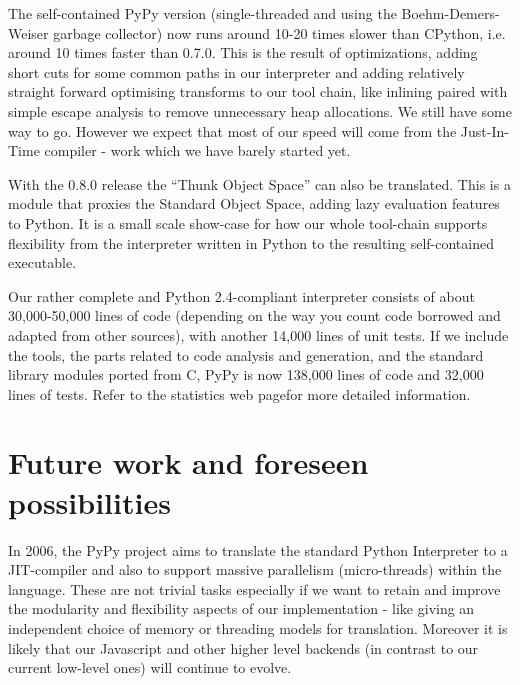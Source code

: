 \documentclass[a4paper,11pt,english]{article}
\begin{document}
The self-contained PyPy version (single-threaded and using the
Boehm-Demers-Weiser garbage collector\footnotemark[10]) now runs around 10-20
times slower than CPython, i.e. around 10 times faster than 0.7.0.
This is the result of optimizations, adding short cuts for some common
paths in our interpreter and adding relatively straight forward
optimising transforms to our tool chain, like inlining paired with
simple escape analysis to remove unnecessary heap allocations.  We
still have some way to go. However we expect that most of our speed
will come from the Just-In-Time compiler - work which we have barely
started yet.

With the 0.8.0 release the ``Thunk Object Space'' can also be
translated. This is a module that proxies the Standard Object Space,
adding lazy evaluation features to Python. It is a small scale
show-case for how our whole tool-chain supports flexibility from the
interpreter written in Python to the resulting self-contained
executable.

Our rather complete and Python 2.4-compliant interpreter consists 
of about 30,000-50,000 lines of code (depending on the way you
count code borrowed and adapted from other sources), with
another 14,000 lines of unit tests.  If we include the tools,
the parts related to code analysis and generation, and the
standard library modules ported from C, PyPy is now 138,000
lines of code and 32,000 lines of tests. Refer to 
the statistics web page\footnotemark[11] for more detailed information.



\hypertarget{future-work-and-foreseen-possibilities}{}
\section{Future work and foreseen possibilities}

In 2006, the PyPy project aims to translate the standard Python
Interpreter to a JIT-compiler and also to support massive parallelism
(micro-threads) within the language.  These are not trivial tasks
especially if we want to retain and improve the modularity and
flexibility aspects of our implementation - like giving an independent
choice of memory or threading models for translation.  Moreover it is
likely that our Javascript and other higher level backends (in
contrast to our current low-level ones) will continue to evolve.
\end{document}
